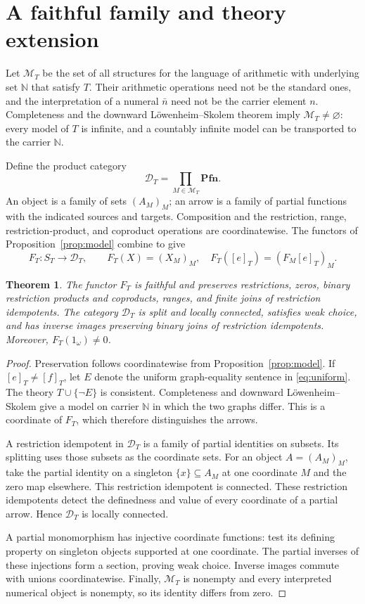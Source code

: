 \documentclass[11pt]{article}
\newtheorem{theorem}{Theorem}[section]
\newcommand{\N}{\mathbb N}
\newcommand{\Pfn}{\mathbf{Pfn}}
\begin{document}
\section{A faithful family and theory extension}\label{sec:family}

Let $\mathcal M_T$ be the set of all structures for the language of
arithmetic with underlying set $\N$ that satisfy $T$. Their arithmetic
operations need not be the standard ones, and the interpretation of a
numeral $\bar n$ need not be the carrier element $n$. Completeness and
the downward L\"owenheim--Skolem theorem imply
$\mathcal M_T\ne\varnothing$: every model of $T$ is infinite, and a
countably infinite model can be transported to the carrier $\N$.

Define the product category
\[
 \mathcal D_T=\prod_{M\in\mathcal M_T}\Pfn.
\]
An object is a family of sets $(A_M)_M$; an arrow is a family of partial
functions with the indicated sources and targets. Composition and the
restriction, range, restriction-product, and coproduct operations are coordinatewise.
The functors of Proposition~\ref{prop:model} combine to give
\[
 F_T:S_T\longrightarrow\mathcal D_T,\qquad
 F_T(X)=(X_M)_M,\quad F_T([e]_T)=(F_M[e]_T)_M.
\]

\begin{theorem}\label{thm:faithful}
The functor $F_T$ is faithful and preserves restrictions, zeros, binary
restriction products and coproducts, ranges, and finite joins of
restriction idempotents. The category
$\mathcal D_T$ is split and locally connected, satisfies weak choice,
and has inverse images preserving binary joins of restriction
idempotents. Moreover,
$F_T(1_\omega)\ne0$.
\end{theorem}
\begin{proof}
Preservation follows coordinatewise from Proposition~\ref{prop:model}.
If $[e]_T\ne[f]_T$, let $E$ denote the uniform graph-equality sentence
in \eqref{eq:uniform}. The theory $T\cup\{\neg E\}$ is consistent.
Completeness and downward L\"owenheim--Skolem give a model on carrier
$\N$ in which the two graphs differ. This is a coordinate of $F_T$,
which therefore distinguishes the arrows.

A restriction idempotent in $\mathcal D_T$ is a family of partial
identities on subsets. Its splitting uses those subsets as the
coordinate sets. For an object $A=(A_M)_M$, take the partial identity
on a singleton $\{x\}\subseteq A_M$ at one coordinate $M$ and the zero
map elsewhere. This restriction idempotent is connected. These
restriction idempotents detect the definedness and value of every coordinate of a partial arrow. Hence
$\mathcal D_T$ is locally connected.

A partial monomorphism has injective coordinate functions: test its
defining property on singleton objects supported at one coordinate.
The partial inverses of these injections form a section, proving weak
choice. Inverse images commute with unions coordinatewise. Finally,
$\mathcal M_T$ is nonempty and every interpreted numerical object is
nonempty, so its identity differs from zero.
\end{proof}
\end{document}
